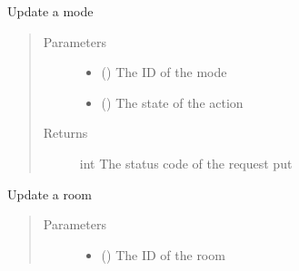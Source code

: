 \documentclass[letterpaper,10pt,english]{sphinxmanual}
\begin{document}
\begin{fulllineitems}
\begin{fulllineitems}
\label{\detokenize{index:Api.Api.update_mode}}
\sphinxAtStartPar
Update a mode
\begin{quote}\begin{description}
\item[{Parameters}] \leavevmode\begin{itemize}
\item {} 
\sphinxAtStartPar
{} () \textendash{} The ID of the mode

\item {} 
\sphinxAtStartPar
{} () \textendash{} The state of the action

\end{itemize}

\item[{Returns}] \leavevmode
\sphinxAtStartPar
int \textendash{} The status code of the request put

\end{description}\end{quote}

\end{fulllineitems}


\begin{fulllineitems}
\label{\detokenize{index:Api.Api.update_room}}
\sphinxAtStartPar
Update a room
\begin{quote}\begin{description}
\item[{Parameters}] \leavevmode\begin{itemize}
\item {} 
\sphinxAtStartPar
{} () \textendash{} The ID of the room


\end{itemize}
\end{description}
\end{quote}
\end{fulllineitems}
\end{fulllineitems}
\end{document}
